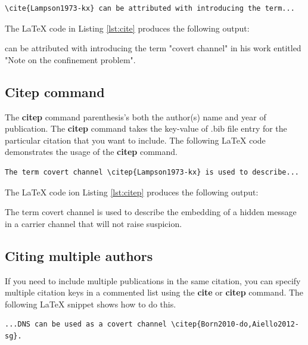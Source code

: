 \begin{lstlisting}[caption={Using the \textbf{cite} command}, numbers=none, label={lst:cite}]
\cite{Lampson1973-kx} can be attributed with introducing the term...
\end{lstlisting}

The \LaTeX{} code in Listing \ref{lst:cite} produces the following output:

\begin{mdframed}
\cite{Lampson1973-kx} can be attributed with introducing the term "covert channel" in his work entitled "Note on the confinement problem".
\end{mdframed}

\subsection{Citep command}\label{sec:citep-command}
The \textbf{citep} command parenthesis's both the author(s) name and year of publication. The \textbf{citep} command takes the key-value of .bib file entry for the particular citation that you want to include. The following \LaTeX{} code demonstrates the usage of the \textbf{citep} command. \\

\begin{lstlisting}[caption={Using the \textbf{citep} command}, numbers=none, label={lst:citep}]
The term covert channel \citep{Lampson1973-kx} is used to describe...
\end{lstlisting}

The \LaTeX{} code ion Listing \ref{lst:citep} produces the following output:

\begin{mdframed}
The term covert channel \citep{Lampson1973-kx} is used to describe the embedding of a hidden message in a carrier channel that will not raise suspicion.
\end{mdframed}


\subsection{Citing multiple authors}\label{sec:cite-multiple}
If you need to include multiple publications in the same citation, you can specify multiple citation keys in a commented list using the \textbf{cite} or \textbf{citep} command. The following \LaTeX{} snippet shows how to do this.

\begin{lstlisting}[caption={Citing multiple authors}, numbers=none, label={lst:cite-multiple}]
...DNS can be used as a covert channel \citep{Born2010-do,Aiello2012-sg}.
\end{lstlisting}

